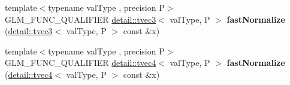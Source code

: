 \begin{DoxyCompactItemize}
\item 
{\footnotesize template$<$typename val\+Type , precision P$>$ }\\G\+L\+M\+\_\+\+F\+U\+N\+C\+\_\+\+Q\+U\+A\+L\+I\+F\+I\+ER \hyperlink{structglm_1_1detail_1_1tvec3}{detail\+::tvec3}$<$ val\+Type, P $>$ {\bfseries fast\+Normalize} (\hyperlink{structglm_1_1detail_1_1tvec3}{detail\+::tvec3}$<$ val\+Type, P $>$ const \&x)\hypertarget{namespaceglm_a79d69adf577a32f7767c7471cb8b43ea}{}\label{namespaceglm_a79d69adf577a32f7767c7471cb8b43ea}

\item 
{\footnotesize template$<$typename val\+Type , precision P$>$ }\\G\+L\+M\+\_\+\+F\+U\+N\+C\+\_\+\+Q\+U\+A\+L\+I\+F\+I\+ER \hyperlink{structglm_1_1detail_1_1tvec4}{detail\+::tvec4}$<$ val\+Type, P $>$ {\bfseries fast\+Normalize} (\hyperlink{structglm_1_1detail_1_1tvec4}{detail\+::tvec4}$<$ val\+Type, P $>$ const \&x)\hypertarget{namespaceglm_afc8a546d803a5a95bc5a85423f757907}{}\label{namespaceglm_afc8a546d803a5a95bc5a85423f757907}


\end{DoxyCompactItemize}
